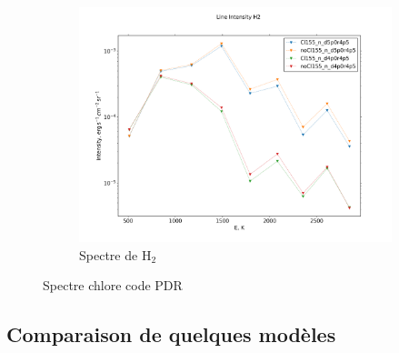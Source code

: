 \begin{figure}[!htbp]
    \begin{subfigure}[t]{0.45\textwidth} %
        \centering \includegraphics[trim = {0 0 0 1.5cm},clip,width=1\textwidth]{figure/Cl/gridModelEmiss/I_comp_H2.png}
        \caption{Spectre de $\mathrm{H}_2$}
    \end{subfigure}
 
    
    \caption{Spectre chlore code PDR \uncinq}
    \label{fig:Cl:gridModelEmiss:no}
\end{figure}


\subsection{Comparaison de quelques modèles}



